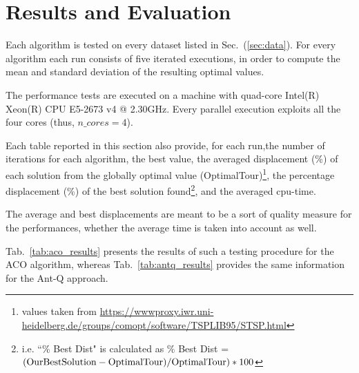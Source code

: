 \documentclass[10pt]{article}
\begin{document}
\section{Results and Evaluation}
Each algorithm is tested on every dataset listed in Sec.~(\ref{sec:data}).
For every algorithm each run consists of five iterated executions, in order to compute the mean and standard deviation of the resulting optimal values. 

The performance tests are executed on a machine with quad-core Intel(R) Xeon(R) CPU E5-2673 v4 @ 2.30GHz. 
Every parallel execution exploits all the four cores (thus, $n\_cores=4$).

Each table reported in this section also provide, for each run,the number of iterations for each algorithm, the best value, the averaged displacement (\%) of each solution from the globally optimal value (OptimalTour)\footnote{values taken from \url{https://wwwproxy.iwr.uni-heidelberg.de/groups/comopt/software/TSPLIB95/STSP.html}}, the percentage displacement (\%) of the best solution found\footnote{i.e. ``\% Best Dist" is calculated as \% Best Dist = $(\rm{OurBestSolution}-\rm{OptimalTour})/\rm{OptimalTour})*100$}, and the averaged cpu-time.

The average and best displacements are meant to be a sort of quality measure for the performances, whether the average time is taken into account as well.

Tab.~\ref{tab:aco_results} presents the results of such a testing procedure for the ACO algorithm, whereas Tab.~\ref{tab:antq_results} provides the same information for the Ant-Q approach.
\end{document}
